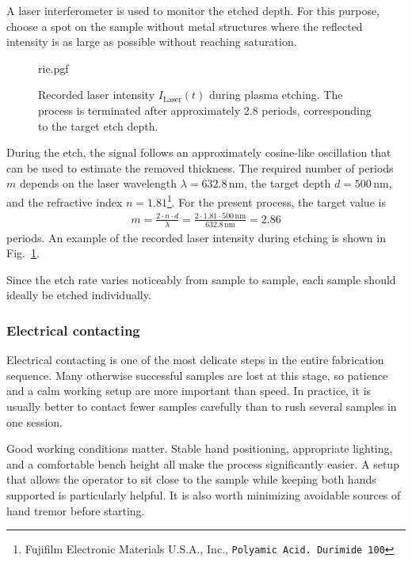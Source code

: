         A laser interferometer is used to monitor the etched depth. For this purpose, choose a spot on the sample without metal structures where the reflected intensity is as large as possible without reaching saturation. 
        
        \begin{figure}
            \captionsetup{format=plain}%
            \centering
            \vspace{-1em}
            {rie.pgf}
            \caption{Recorded laser intensity $I_{\mathrm{Laser}}(t)$ during plasma etching. The process is terminated after approximately 2.8 periods, corresponding to the target etch depth.}
            \label{fig:methods:rie}
        \end{figure}
        During the etch, the signal follows an approximately cosine-like oscillation that can be used to estimate the removed thickness. The required number of periods $m$ depends on the laser wavelength $\lambda=632.8\,\mathrm{nm}$, the target depth $d=500\,\mathrm{nm}$, and the refractive index $n=1.81$\footnote{Fujifilm Electronic Materials U.S.A., Inc., \texttt{Polyamic Acid. Durimide 100}}. For the present process, the target value is
        \begin{align}
            m = \frac{2 \cdot n \cdot d}{\lambda} = \frac{2 \cdot 1.81 \cdot 500\,\mathrm{nm}}{632.8\,\mathrm{nm}} = 2.86
        \end{align}
        periods. An example of the recorded laser intensity during etching is shown in Fig.~\ref{fig:methods:rie}.
        
        Since the etch rate varies noticeably from sample to sample, each sample should ideally be etched individually.

    \subsubsection*{Electrical contacting}
        Electrical contacting is one of the most delicate steps in the entire fabrication sequence. Many otherwise successful samples are lost at this stage, so patience and a calm working setup are more important than speed. In practice, it is usually better to contact fewer samples carefully than to rush several samples in one session.

        Good working conditions matter. Stable hand positioning, appropriate lighting, and a comfortable bench height all make the process significantly easier. A setup that allows the operator to sit close to the sample while keeping both hands supported is particularly helpful. It is also worth minimizing avoidable sources of hand tremor before starting.

